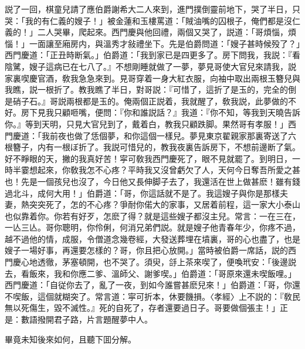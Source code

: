 説了一回，棋童兒請了應伯爵謝希大二人來到，進門撲倒靈前地下，哭了半日，只哭：「我的有仁義的嫂子！」被金蓮和玉樓罵道：「賊油嘴的囚根子，俺們都是沒仁義的！」二人哭畢，爬起來。西門慶與他回禮，兩個又哭了，説道：「哥煩惱，煩惱！」一面讓至廂房内，與溫秀才敍禮坐下。先是伯爵問道：「嫂子甚時候殁了？」西門慶道：「正丑時断氣。」伯爵道：「我到家已是四更多了。房下問我，我説：『看陰騭，嫂子這病已在七八了。』不想剛睡就做了一夢，夢見哥使大官兒來請我，説家裏喫慶官酒，敎我急急來到。見哥穿着一身大紅衣服，向袖中取出兩根玉簪兒與我瞧，説一根折了。教我瞧了半日，對哥説：『可惜了，這折了是玉的，完全的倒是硝子石。』哥説兩根都是玉的。俺兩個正説着，我就醒了，敎我説，此夢做的不好。房下見我只顧咂嘴，便問：『你和誰説話？』我道：『你不知，等我到天曉告訴你。』等到天明，只見大官兒到了，戴着白，教我只顧跌脚。果然哥有孝服！」西門慶道：「我前夜也做了恁個夢，和你這個一樣兒。夢見東京翟親家那裏寄送了六根簪子，内有一根ぼ折了。我説可惜兒的，教我夜裏告訴房下，不想前邊断了氣。好不睜眼的天，撇的我真好苦！寜可敎我西門慶死了，眼不見就罷了。到明日，一時半霎想起來，你敎我怎不心疼？平時我又沒曾虧欠了人，天何今日奪吾所愛之甚也！先是一個孩兒也沒了，今日他又長伸脚子去了，我還活在世上做甚麽！雖有錢過北斗，成何大用！」伯爵道：「哥，你這話就不是了。我這嫂子與你是那樣夫妻，熱突突死了，怎的不心疼？爭耐你偌大的家事，又居着前程，這一家大小泰山也似靠着你。你若有好歹，怎麽了得？就是這些嫂子都沒主兒。常言：一在三在，一亾三亾。哥你聰明，你伶俐，何消兄弟們説。就是嫂子他青春年少，你疼不過，越不過他的情，成服，令僧道念幾卷經，大發送葬埋在墳裏，哥的心也盡了，也是嫂子一場好事，再還要怎樣的？哥，你且把心放開。」當時被伯爵一席話，説的西門慶心地透徹，茅塞頓開，也不哭了。須臾，㧱上茶來喫了，便喚玳安：「後邊説去，看飯來，我和你應二爹、溫師父、謝爹喫。」伯爵道：「哥原來還未喫飯哩。」西門慶道：「自従你去了，亂了一夜，到如今誰嘗甚麽兒來！」伯爵道：「哥，你還不喫飯，這個就糊突了。常言道：寜可折本，休要饑損。〈孝經〉上不説的：『敎民無以死傷生，毀不滅性。』死的自死了，存者還要過日子。哥要做個張主！」正是：數語撥開君子路，片言題醒夢中人。

畢竟未知後來如何，且聽下囬分解。

